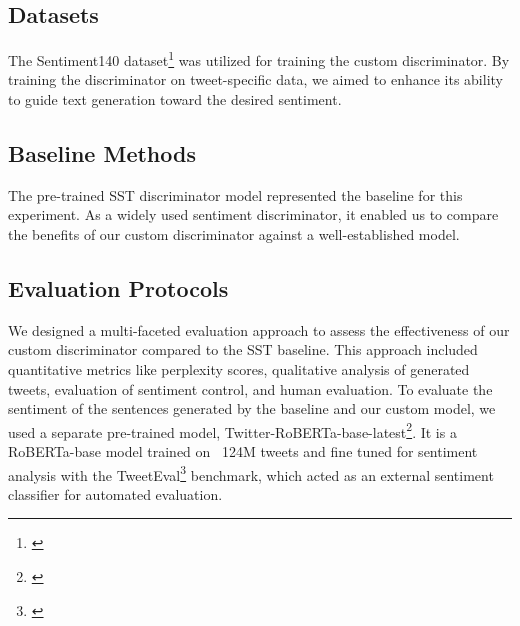 \documentclass[11pt]{article}
\begin{document}
\subsection{Datasets}
The Sentiment140 dataset\footnote{\citep{sentiment140-kaggle}} was utilized for training the custom discriminator. By training the discriminator on tweet-specific data, we aimed to enhance its ability to guide text generation toward the desired sentiment. 

\subsection{Baseline Methods}
The pre-trained SST discriminator model represented the baseline for this experiment. As a widely used sentiment discriminator, it enabled us to compare the benefits of our custom discriminator against a well-established model.

\subsection{Evaluation Protocols}
We designed a multi-faceted evaluation approach to assess the effectiveness of our custom discriminator compared to the SST baseline. This approach included quantitative metrics like perplexity scores, qualitative analysis of generated tweets, evaluation of sentiment control, and human evaluation. To evaluate the sentiment of the sentences generated by the baseline and our custom model, we used a separate pre-trained model, Twitter-RoBERTa-base-latest\footnote{\citep{roberta-huggingface}}. It is a RoBERTa-base model trained on ~124M tweets and fine tuned for sentiment analysis with the TweetEval\footnote{\citep{tweet-eval-paper}} benchmark, which acted as an external sentiment classifier for automated evaluation. 
\end{document}
